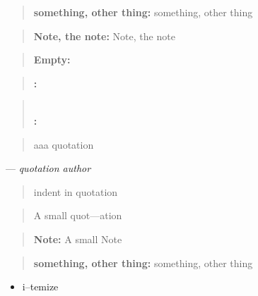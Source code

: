 \documentclass{book}
\begin{document}
\begin{titlepage}
\begin{quote}
\textbf{something, other thing:} something, other thing
\end{quote}

\begin{quote}
\textbf{Note, the note:} Note, the note
\end{quote}

\begin{quote}
\end{quote}

\begin{quote}
\textbf{Empty:} \end{quote}

\begin{quote}
\textbf{:} \end{quote}

\begin{quote}
\textbf{\leavevmode{}\\:} \end{quote}

\begin{quote}
aaa quotation
\end{quote}
\begin{center}
--- \emph{quotation author}
\end{center}

\begin{quote}
indent in quotation
\end{quote}

\begin{quote}
\begin{footnotesize}
A small quot---ation
\end{footnotesize}
\end{quote}

\begin{quote}
\begin{footnotesize}
\textbf{Note:} A small Note
\end{footnotesize}
\end{quote}

\begin{quote}
\begin{footnotesize}
\textbf{something, other thing:} something, other thing
\end{footnotesize}
\end{quote}

\begin{itemize}
\item i--temize
\end{itemize}


\end{titlepage}
\end{document}
